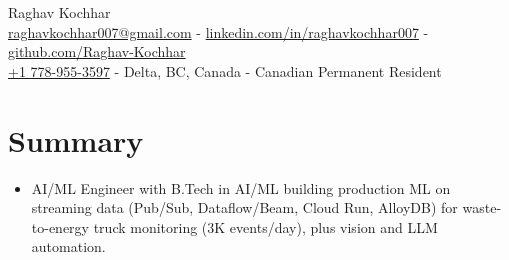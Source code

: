 \documentclass[a4paper,10pt]{article}
\begin{document}
\begin{center}
    {\LARGE Raghav Kochhar}\\[1pt]
    \href{mailto:raghavkochhar007@gmail.com}{raghavkochhar007@gmail.com} -
    \href{https://linkedin.com/in/raghavkochhar007}{linkedin.com/in/raghavkochhar007} -
    \href{https://github.com/Raghav-Kochhar}{github.com/Raghav-Kochhar}\\[1pt]
    \href{tel:+17789553597}{+1 778-955-3597} -
    Delta, BC, Canada -
    Canadian Permanent Resident
\end{center}

\section{Summary}
\begin{itemize}
    \item AI/ML Engineer with B.Tech in AI/ML building
        production ML on streaming data (Pub/Sub, Dataflow/Beam,
        Cloud Run, AlloyDB) for waste-to-energy truck monitoring
        (3K events/day), plus vision and LLM automation.
\end{itemize}
\end{document}
